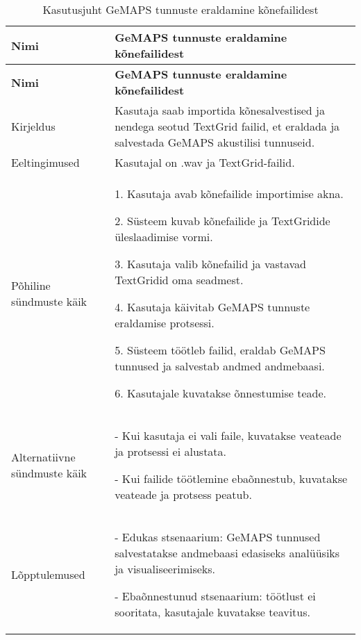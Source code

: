 \begin{longtable}{|p{2.5cm}|p{11cm}|}
    \caption{Kasutusjuht GeMAPS tunnuste eraldamine kõnefailidest}
    \label{tab:kasutusjuht1}\\ \hline
    \textbf{Nimi} &  \textbf{GeMAPS tunnuste eraldamine kõnefailidest}  \\
    \hline
    \endfirsthead
    \hline
    \textbf{Nimi} &  \textbf{GeMAPS tunnuste eraldamine kõnefailidest}  \\
    \hline
    \endhead
    \hline
    \endfoot
    \hline
    \endlastfoot
    Kirjeldus & Kasutaja saab importida kõnesalvestised ja nendega seotud TextGrid failid, et eraldada ja salvestada GeMAPS akustilisi tunnuseid.\\ \hline
    Eeltingimused & Kasutajal on .wav ja TextGrid-failid.\\ \hline
    Põhiline sündmuste käik & 
    1. Kasutaja avab kõnefailide importimise akna.
    
    2. Süsteem kuvab kõnefailide ja TextGridide üleslaadimise vormi.
    
    3. Kasutaja valib kõnefailid ja vastavad TextGridid oma seadmest.
    
    4. Kasutaja käivitab GeMAPS tunnuste eraldamise protsessi.
    
    5. Süsteem töötleb failid, eraldab GeMAPS tunnused ja salvestab andmed andmebaasi.
    
    6. Kasutajale kuvatakse õnnestumise teade.
    \\ \hline
    Alternatiivne sündmuste käik & 
    - Kui kasutaja ei vali faile, kuvatakse veateade ja protsessi ei alustata.
    
    - Kui failide töötlemine ebaõnnestub, kuvatakse veateade ja protsess peatub.
    \\ \hline
    Lõpptulemused & 
    - Edukas stsenaarium: GeMAPS tunnused salvestatakse andmebaasi edasiseks analüüsiks ja visualiseerimiseks.
    
    - Ebaõnnestunud stsenaarium: töötlust ei sooritata, kasutajale kuvatakse teavitus.
    \\ \hline
\end{longtable}

